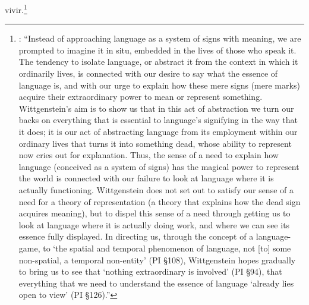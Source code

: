 vivir.\footnote{\cite[Cf.~][48]{mcginn2013guide}: \enquote{Instead of approaching language as a system of signs with meaning, we are prompted to imagine it in situ, embedded in the lives of those who speak it. The tendency to isolate language, or abstract it from the context in which it ordinarily lives, is connected with our desire to say what the essence of language is, and with our urge to explain how these mere signs (mere marks) acquire their extraordinary power to mean or represent something. Wittgenstein’s aim is to show us that in this act of abstraction we turn our backs on everything that is essential to language’s signifying in the way that it does; it is our act of abstracting language from its employment within our ordinary lives that turns it into something dead, whose ability to represent now cries out for explanation. Thus, the sense of a need to explain how language (conceived as a system of signs) has the magical power to represent the world is connected with our failure to look at language where it is actually functioning. Wittgenstein does not set out to satisfy our sense of a need for a theory of representation (a theory that explains how the dead sign acquires meaning), but to dispel this sense of a need through getting us to look at language where it is actually doing work, and where we can see its essence fully displayed. In directing us, through the concept of a language-game, to ‘the spatial and temporal phenomenon of language, not [to] some non-spatial, a temporal non-entity’ (PI §108), Wittgenstein hopes gradually to bring us to see that ‘nothing extraordinary is involved’ (PI §94), that everything that we need to understand the essence of language ‘already lies open to view’ (PI §126).}}
